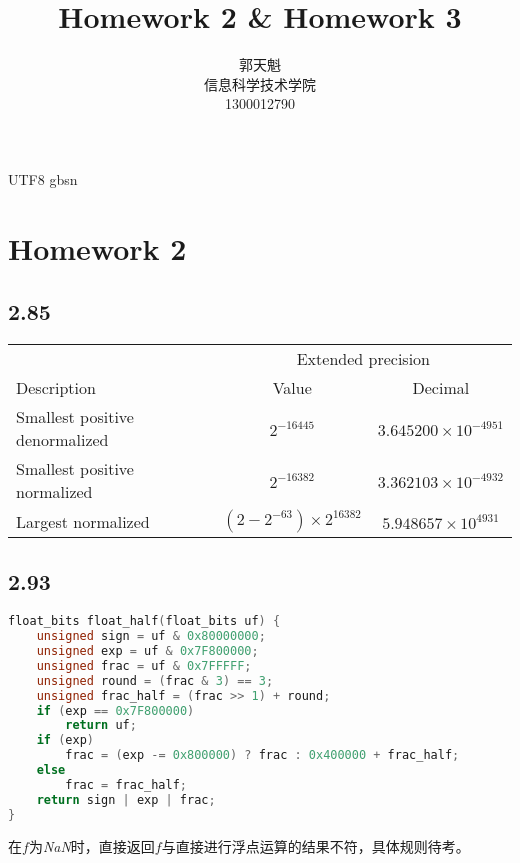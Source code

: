 \documentclass {article}
\begin{document}
  \begin {CJK*} {UTF8} {gbsn}
    \title {\textbf {\Huge Homework 2 \& Homework 3}}
	\author {郭天魁 \\ 信息科学技术学院 \\ 1300012790}

	\maketitle

	\section{Homework 2}
	  \subsection{2.85}
	    \begin{table}[h]
		  \begin{tabular}{lcc}
			                                 & \multicolumn{2}{c}{Extended precision}                      \\ \cline{2-3} 
			  Description                    & Value                         & Decimal                     \\ \hline
			  Smallest positive denormalized & $2^{-16445}$                  & $3.645200\times 10^{-4951}$ \\
			  Smallest positive normalized   & $2^{-16382}$                  & $3.362103\times 10^{-4932}$ \\
			  Largest normalized             & $(2-2^{-63})\times 2^{16382}$ & $5.948657\times 10^{4931}$ 
		  \end{tabular}
	    \end{table}

	  \subsection{2.93}
	    \begin{lstlisting}[language=C]
float_bits float_half(float_bits uf) {
	unsigned sign = uf & 0x80000000;
	unsigned exp = uf & 0x7F800000;
	unsigned frac = uf & 0x7FFFFF;
	unsigned round = (frac & 3) == 3;
	unsigned frac_half = (frac >> 1) + round;
	if (exp == 0x7F800000)
		return uf;
	if (exp)
		frac = (exp -= 0x800000) ? frac : 0x400000 + frac_half;
	else
		frac = frac_half;
	return sign | exp | frac;
}
        \end{lstlisting}
		在$f$为\textit{NaN}时，直接返回$f$与直接进行浮点运算的结果不符，具体规则待考。\\


\end{CJK*}
\end{document}
